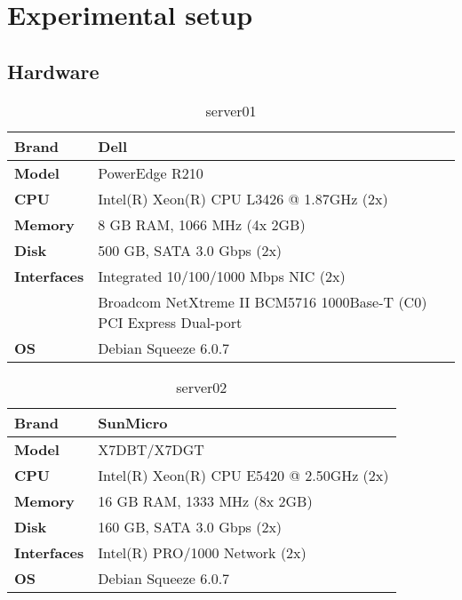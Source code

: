 \documentclass[Configuration]{subfiles}
\begin{document}
\newpage
\section{Experimental setup}
\label{sec:Experimental setup}

\subsection{Hardware}

\begin{table}[h]
\caption{server01}
\centering
\begin{tabular}{|p{2cm}|p{9cm}|}
\hline
\textbf{Brand} & Dell \\ \hline
\textbf{Model} & PowerEdge R210 \\ \hline
\textbf{CPU} & Intel(R) Xeon(R) CPU L3426 @ 1.87GHz (2x)\\ \hline
\textbf{Memory} & 8 GB RAM, 1066 MHz (4x 2GB) \\ \hline
\textbf{Disk} & 500 GB, SATA 3.0 Gbps (2x)\\ \hline
\textbf{Interfaces} &  Integrated 10/100/1000 Mbps NIC (2x) \\ \hline
 & Broadcom NetXtreme II BCM5716 1000Base-T (C0) PCI Express Dual-port \\ \hline
\textbf{OS} & Debian Squeeze 6.0.7 \\ \hline
\end{tabular}
\end{table}

\begin{table}[h]
\caption{server02}
\centering
\begin{tabular}{|p{2cm}|p{9cm}|}
\hline
\textbf{Brand} & SunMicro \\ \hline
\textbf{Model} & X7DBT/X7DGT \\ \hline
\textbf{CPU} & Intel(R) Xeon(R) CPU E5420 @ 2.50GHz (2x)\\ \hline
\textbf{Memory} & 16 GB RAM, 1333 MHz (8x 2GB) \\ \hline
\textbf{Disk} & 160 GB, SATA 3.0 Gbps (2x)\\ \hline
\textbf{Interfaces} &   Intel(R) PRO/1000 Network (2x) \\ \hline
\textbf{OS} & Debian Squeeze 6.0.7 \\ \hline
\end{tabular}
\end{table}
\end{document}
